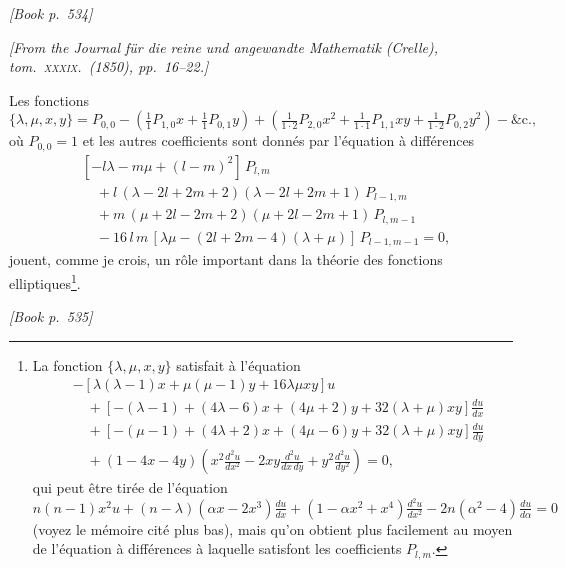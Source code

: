 \documentclass[11pt]{article}
\begin{document}
\noindent\textit{[Book p.~534]}\hfill

\smallskip

\noindent\emph{[From the Journal f\"ur die reine und angewandte Mathematik (Crelle), tom.~\textsc{xxxix}.\ (1850), pp.~16--22.]}

\medskip

\noindent Les fonctions
\[
\{\lambda,\mu,x,y\} = P_{0,0} - \left(\tfrac{1}{1}P_{1,0}x + \tfrac{1}{1}P_{0,1}y\right) + \left(\tfrac{1}{1\cdot 2}P_{2,0}x^{2} + \tfrac{1}{1\cdot 1}P_{1,1}xy + \tfrac{1}{1\cdot 2}P_{0,2}y^{2}\right) - \&\text{c.},
\]
o\`u $P_{0,0} = 1$ et les autres coefficients sont donn\'es par l'\'equation \`a diff\'erences
\[
\begin{aligned}
&[-l\lambda - m\mu + (l - m)^{2}]\,P_{l,m}\\
&\quad + l\,(\lambda - 2l + 2m + 2)(\lambda - 2l + 2m + 1)\,P_{l-1,m}\\
&\quad + m\,(\mu + 2l - 2m + 2)(\mu + 2l - 2m + 1)\,P_{l,m-1}\\
&\quad - 16\,l\,m\,[\lambda\mu - (2l + 2m - 4)(\lambda + \mu)]\,P_{l-1,m-1} = 0,
\end{aligned}
\]
jouent, comme je crois, un r\^ole important dans la th\'eorie des fonctions elliptiques\footnote{La fonction $\{\lambda,\mu,x,y\}$ satisfait \`a l'\'equation
\[
\begin{aligned}
&- [\lambda(\lambda-1)x + \mu(\mu-1)y + 16\lambda\mu xy]u\\
&\quad + [-(\lambda-1) + (4\lambda-6)x + (4\mu+2)y + 32(\lambda+\mu)xy]\tfrac{du}{dx}\\
&\quad + [-(\mu-1) + (4\lambda+2)x + (4\mu-6)y + 32(\lambda+\mu)xy]\tfrac{du}{dy}\\
&\quad + (1 - 4x - 4y)\left(x^{2}\tfrac{d^{2}u}{dx^{2}} - 2xy\tfrac{d^{2}u}{dx\,dy} + y^{2}\tfrac{d^{2}u}{dy^{2}}\right) = 0,
\end{aligned}
\]
qui peut \^etre tir\'ee de l'\'equation
\[
n(n-1)x^{2}u + (n-\lambda)(\alpha x - 2x^{3})\tfrac{du}{dx} + (1 - \alpha x^{2} + x^{4})\tfrac{d^{2}u}{dx^{2}} - 2n(\alpha^{2}-4)\tfrac{du}{d\alpha} = 0
\]
(voyez le m\'emoire cit\'e plus bas), mais qu'on obtient plus facilement au moyen de l'\'equation \`a diff\'erences \`a laquelle satisfont les coefficients $P_{l,m}$.}.

\medskip
\noindent\textit{[Book p.~535]}\hfill

\smallskip
\end{document}
